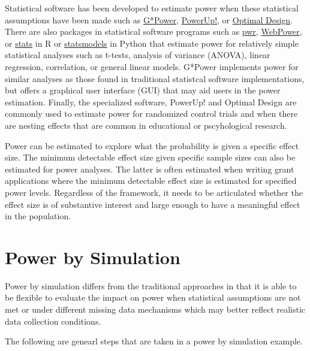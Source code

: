 \documentclass[man]{apa6}
\begin{document}
Statistical software has been developed to estimate power when these statistical assumptions have been made such as \href{http://www.gpower.hhu.de/}{G*Power}, \href{https://www.causalevaluation.org/power-analysis.html}{PowerUp!}, or \href{http://hlmsoft.net/od/}{Optimal Design}. There are also packages in statistical software programs such as \href{https://cran.r-project.org/package=pwr}{pwr}, \href{https://cran.r-project.org/package=WebPower}{WebPower}, or \href{https://cran.r-project.org/package=STAT}{stats} in R or \href{http://www.statsmodels.org/}{statsmodels} in Python that estimate power for relatively simple statistical analyses such as t-tests, analysis of variance (ANOVA), linear regression, correlation, or general linear models. G*Power implements power for similar analyses as those found in traditional statistcal software implementations, but offers a graphical user interface (GUI) that may aid users in the power estimation. Finally, the specialized software, PowerUp! and Optimal Design are commonly used to estimate power for randomized control trials and when there are nesting effects that are common in educational or pscyhological research.

Power can be estimated to explore what the probability is given a specific effect size. The minimum detectable effect size given specific sample sizes can also be estimated for power analyses. The latter is often estimated when writing grant applications where the minimum detectable effect size is estimated for specified power levels. Regardless of the framework, it needs to be articulated whether the effect size is of substantive interest and large enough to have a meaningful effect in the population.

\hypertarget{power-by-simulation}{%
\section{Power by Simulation}\label{power-by-simulation}}

Power by simulation differs from the traditional approaches in that it is able to be flexible to evaluate the impact on power when statistical assumptions are not met or under different missing data mechanisms which may better reflect realistic data collection conditions.

The following are genearl steps that are taken in a power by simulation example.
\end{document}
